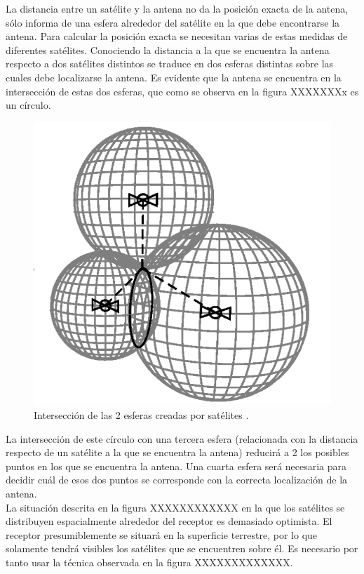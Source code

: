 La distancia entre un satélite y la antena no da la posición exacta de la antena, sólo informa de una esfera alrededor del satélite en la que debe encontrarse la antena. Para calcular la posición exacta se necesitan varias de estas medidas de diferentes satélites. Conociendo la distancia a la que se encuentra la antena respecto a dos satélites distintos se traduce en dos esferas distintas sobre las cuales debe localizarse la antena. Es evidente que la antena se encuentra en la intersección de estas dos esferas, que como se observa en la figura XXXXXXXx es un círculo.

\begin{figure}
	\centering
	\includegraphics[width=1\textwidth]{imagenes/interseccion2esferas.PNG}
	\caption{\label{fig1}Intersección de las 2 esferas creadas por satélites \cite{gnss}.}
\end{figure}

La intersección de este círculo con una tercera esfera (relacionada con la distancia respecto de un satélite a la que se encuentra la antena) reducirá a 2 los posibles puntos en los que se encuentra la antena. Una cuarta esfera será necesaria para decidir cuál de esos dos puntos se corresponde con la correcta localización de la antena. \newline\\

La situación descrita en la figura XXXXXXXXXXXX en la que los satélites se distribuyen espacialmente alrededor del receptor es demasiado optimista. El receptor presumiblemente se situará en la superficie terrestre, por lo que solamente tendrá visibles los satélites que se encuentren sobre él. Es necesario por tanto usar la técnica observada en la figura XXXXXXXXXXXXX. \newline

